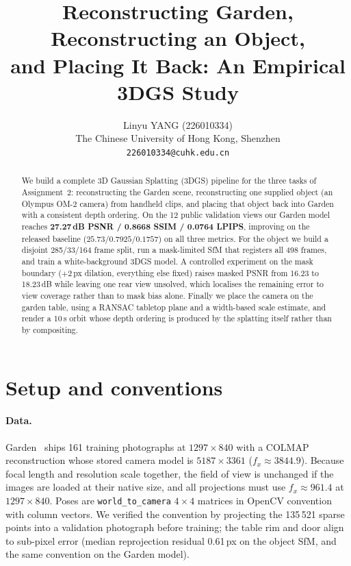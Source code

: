 \documentclass[10pt,twocolumn,letterpaper]{article}
\title{Reconstructing Garden, Reconstructing an Object,\\and Placing It Back: An Empirical 3DGS Study}
\author{Linyu YANG (226010334)\\
The Chinese University of Hong Kong, Shenzhen\\
\tt\small 226010334@cuhk.edu.cn}
\begin{document}
\maketitle

\begin{abstract}
We build a complete 3D Gaussian Splatting (3DGS) pipeline for the three tasks of Assignment~2:
reconstructing the Garden scene, reconstructing one supplied object (an Olympus OM-2 camera)
from handheld clips, and placing that object back into Garden with a consistent depth ordering.
On the 12 public validation views our Garden model reaches \textbf{27.27\,dB PSNR / 0.8668 SSIM /
0.0764 LPIPS}, improving on the released baseline ($25.73 / 0.7925 / 0.1757$) on all three
metrics. For the object we build a disjoint 285/33/164 frame split, run a mask-limited SfM
that registers all 498 frames, and train a white-background 3DGS model. A controlled experiment
on the mask boundary ($+2$\,px dilation, everything else fixed) raises masked PSNR from
16.23 to 18.23\,dB while leaving one rear view unsolved, which localises the remaining error to
view coverage rather than to mask bias alone. Finally we place the camera on the garden table,
using a RANSAC tabletop plane and a width-based scale estimate, and render a 10\,s orbit whose
depth ordering is produced by the splatting itself rather than by compositing.
\end{abstract}

\section{Setup and conventions}

\paragraph{Data.} Garden~\cite{barron2022} ships 161 training photographs at $1297\times840$ with a COLMAP
reconstruction whose stored camera model is $5187\times3361$ ($f_x\!\approx\!3844.9$).
Because focal length and resolution scale together, the field of view is unchanged if the images
are loaded at their native size, and all projections must use $f_x\!\approx\!961.4$ at
$1297\times840$. Poses are \texttt{world\_to\_camera} $4\times4$ matrices in OpenCV convention
with column vectors. We verified the convention by projecting the 135\,521 sparse points into a
validation photograph before training; the table rim and door align to sub-pixel error
(median reprojection residual 0.61\,px on the object SfM, and the same convention on the Garden
model).
\end{document}

